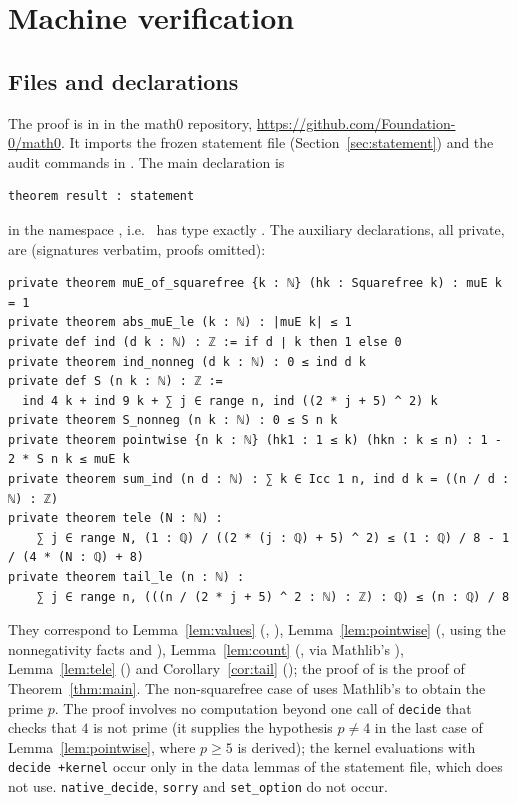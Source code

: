\documentclass[11pt]{amsart}
\theoremstyle{plain}
\theoremstyle{definition}
\begin{document}
\section{Machine verification}\label{sec:lean}

\subsection*{Files and declarations}
The proof is in  in the math0 repository, \url{https://github.com/Foundation-0/math0}. It imports the frozen statement file  (Section~\ref{sec:statement}) and the audit commands in . The main declaration is
\begin{lstlisting}
theorem result : statement
\end{lstlisting}
in the namespace , i.e.\  has type exactly . The auxiliary declarations, all private, are (signatures verbatim, proofs omitted):
\begin{lstlisting}
private theorem muE_of_squarefree {k : ℕ} (hk : Squarefree k) : muE k = 1
private theorem abs_muE_le (k : ℕ) : |muE k| ≤ 1
private def ind (d k : ℕ) : ℤ := if d ∣ k then 1 else 0
private theorem ind_nonneg (d k : ℕ) : 0 ≤ ind d k
private def S (n k : ℕ) : ℤ :=
  ind 4 k + ind 9 k + ∑ j ∈ range n, ind ((2 * j + 5) ^ 2) k
private theorem S_nonneg (n k : ℕ) : 0 ≤ S n k
private theorem pointwise {n k : ℕ} (hk1 : 1 ≤ k) (hkn : k ≤ n) : 1 - 2 * S n k ≤ muE k
private theorem sum_ind (n d : ℕ) : ∑ k ∈ Icc 1 n, ind d k = ((n / d : ℕ) : ℤ)
private theorem tele (N : ℕ) :
    ∑ j ∈ range N, (1 : ℚ) / ((2 * (j : ℚ) + 5) ^ 2) ≤ (1 : ℚ) / 8 - 1 / (4 * (N : ℚ) + 8)
private theorem tail_le (n : ℕ) :
    ∑ j ∈ range n, (((n / (2 * j + 5) ^ 2 : ℕ) : ℤ) : ℚ) ≤ (n : ℚ) / 8
\end{lstlisting}
They correspond to Lemma~\ref{lem:values} (, ), Lemma~\ref{lem:pointwise} (, using the nonnegativity facts  and ), Lemma~\ref{lem:count} (, via Mathlib's ), Lemma~\ref{lem:tele} () and Corollary~\ref{cor:tail} (); the proof of  is the proof of Theorem~\ref{thm:main}. The non-squarefree case of  uses Mathlib's  to obtain the prime $p$. The proof involves no computation beyond one call of \texttt{decide} that checks that $4$ is not prime (it supplies the hypothesis $p\ne4$ in the last case of Lemma~\ref{lem:pointwise}, where $p\ge5$ is derived); the kernel evaluations with \texttt{decide +kernel} occur only in the data lemmas of the statement file, which  does not use. \texttt{native\_decide}, \texttt{sorry} and \texttt{set\_option} do not occur.
\end{document}
